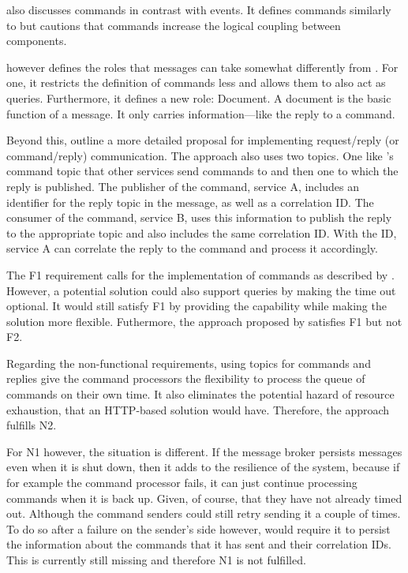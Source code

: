 \cite[185--186]{millett_patterns_2015} also discusses commands in contrast with events.
It defines commands similarly to \cite[]{stopford_designing_2018} but cautions that commands increase the logical coupling between components.

\cite[86]{richardson_microservices_2019} however defines the roles that messages can take somewhat differently from \cite[]{stopford_designing_2018}.
For one, it restricts the definition of commands less and allows them to also act as queries.
Furthermore, it defines a new role: Document.
A document is the basic function of a message.
It only carries information---like the reply to a command.

Beyond this, \cite[87--90]{richardson_microservices_2019} outline a more detailed proposal for implementing request/reply (or command/reply) communication.
The approach also uses two topics.
One like \citeauthor{stopford_designing_2018}'s command topic that other services send commands to and then one to which the reply is published.
The publisher of the command, service A, includes an identifier for the reply topic in the message, as well as a correlation ID.
The consumer of the command, service B, uses this information to publish the reply to the appropriate topic and also includes the same correlation ID.
With the ID, service A can correlate the reply to the command and process it accordingly.

The F1 requirement calls for the implementation of commands as described by \citeauthor{stopford_designing_2018}.
However, a potential solution could also support queries by making the time out optional.
It would still satisfy F1 by providing the capability while making the solution more flexible.
Futhermore, the approach proposed by \citeauthor{richardson_microservices_2019} satisfies F1 but not F2.

Regarding the non-functional requirements, using topics for commands and replies give the command processors the flexibility to process the queue of commands on their own time.
It also eliminates the potential hazard of resource exhaustion, that an HTTP-based solution would have.
Therefore, the approach fulfills N2.

For N1 however, the situation is different.
If the message broker persists messages even when it is shut down, then it adds to the resilience of the system, because if for example the command processor fails, it can just continue processing commands when it is back up.
Given, of course, that they have not already timed out.
Although the command senders could still retry sending it a couple of times.
To do so after a failure on the sender's side however, would require it to persist the information about the commands that it has sent and their correlation IDs.
This is currently still missing and therefore N1 is not fulfilled.

